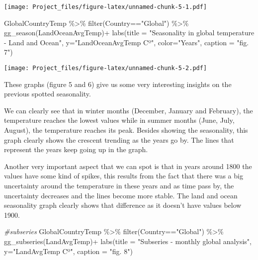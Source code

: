 \documentclass[
]{article}
\newenvironment{Shaded}{\begin{snugshade}}{\end{snugshade}}
\newcommand{\AttributeTok}[1]{\textcolor[rgb]{0.77,0.63,0.00}{#1}}
\newcommand{\CommentTok}[1]{\textcolor[rgb]{0.56,0.35,0.01}{\textit{#1}}}
\newcommand{\FunctionTok}[1]{\textcolor[rgb]{0.00,0.00,0.00}{#1}}
\newcommand{\NormalTok}[1]{#1}
\newcommand{\SpecialCharTok}[1]{\textcolor[rgb]{0.00,0.00,0.00}{#1}}
\newcommand{\StringTok}[1]{\textcolor[rgb]{0.31,0.60,0.02}{#1}}
\begin{document}
\texttt{[image: Project\_files/figure-latex/unnamed-chunk-5-1.pdf]}

\begin{Shaded}
\begin{Highlighting}[]
\NormalTok{GlobalCountryTemp }\SpecialCharTok{\%\textgreater{}\%} 
  \FunctionTok{filter}\NormalTok{(Country}\SpecialCharTok{==}\StringTok{"Global"}\NormalTok{) }\SpecialCharTok{\%\textgreater{}\%} 
  \FunctionTok{gg\_season}\NormalTok{(LandOceanAvgTemp)}\SpecialCharTok{+}
  \FunctionTok{labs}\NormalTok{(}\AttributeTok{title =} \StringTok{"Seasonality in global temperature {-} Land and Ocean"}\NormalTok{,}
       \AttributeTok{y=}\StringTok{"LandOceanAvgTemp Cº"}\NormalTok{,}
       \AttributeTok{color=}\StringTok{"Years"}\NormalTok{,}
       \AttributeTok{caption =} \StringTok{"fig. 7"}\NormalTok{)}
\end{Highlighting}
\end{Shaded}

\texttt{[image: Project\_files/figure-latex/unnamed-chunk-5-2.pdf]}

These graphs (figure 5 and 6) give us some very interesting insights on
the previous spotted seasonality.

We can clearly see that in winter months (December, January and
February), the temperature reaches the lowest values while in summer
months (June, July, August), the temperature reaches its peak. Besides
showing the seasonality, this graph clearly shows the crescent trending
as the years go by. The lines that represent the years keep going up in
the graph.

Another very important aspect that we can spot is that in years around
1800 the values have some kind of spikes, this results from the fact
that there was a big uncertainty around the temperature in these years
and as time pass by, the uncertainty decreases and the lines become more
stable. The land and ocean seasonality graph clearly shows that
difference as it doesn't have values below 1900.

\begin{Shaded}
\begin{Highlighting}[]
\CommentTok{\#subseries}
\NormalTok{GlobalCountryTemp }\SpecialCharTok{\%\textgreater{}\%} 
  \FunctionTok{filter}\NormalTok{(Country}\SpecialCharTok{==}\StringTok{"Global"}\NormalTok{) }\SpecialCharTok{\%\textgreater{}\%} 
  \FunctionTok{gg\_subseries}\NormalTok{(LandAvgTemp)}\SpecialCharTok{+}
  \FunctionTok{labs}\NormalTok{(}\AttributeTok{title =} \StringTok{"Subseries {-} monthly global analysis"}\NormalTok{,}
       \AttributeTok{y=}\StringTok{"LandAvgTemp Cº"}\NormalTok{,}
       \AttributeTok{caption =} \StringTok{"fig. 8"}\NormalTok{)}
\end{Highlighting}
\end{Shaded}
\end{document}
